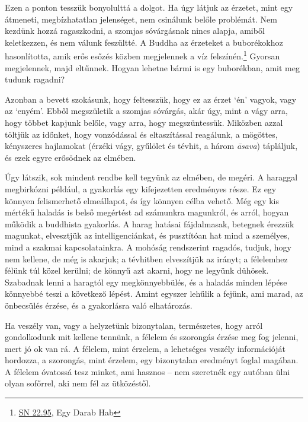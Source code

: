 
Ezen a ponton tesszük bonyolulttá a dolgot. Ha úgy látjuk az érzetet,
mint egy átmeneti, megbízhatatlan jelenséget, nem csinálunk belőle
problémát. Nem kezdünk hozzá ragaszkodni, a szomjas sóvárgásnak nincs
alapja, amiből keletkezzen, és nem válunk feszültté. A Buddha az
érzeteket a buborékokhoz hasonlította, amik erős esőzés közben
megjelennek a víz felszínén.\footnote{\href{https://suttacentral.net/sn22.95}{SN
  22.95}, Egy Darab Hab} Gyorsan megjelennek, majd eltűnnek. Hogyan
lehetne bármi is egy buborékban, amit meg tudunk ragadni?

Azonban a bevett szokásunk, hogy feltesszük, hogy ez az érzet `én'
vagyok, vagy az `enyém'. Ebből megszületik a szomjas sóvárgás, akár úgy,
mint a vágy arra, hogy többet kapjunk belőle, vagy arra, hogy
megszüntessük. Miközben azzal töltjük az időnket, hogy vonzódással és
eltaszítással reagálunk, a mögöttes, kényszeres hajlamokat (érzéki vágy,
gyűlölet és tévhit, a három \emph{āsava}) tápláljuk, és ezek egyre
erősödnek az elmében.

Úgy látszik, sok mindent rendbe kell tegyünk az elmében, de megéri. A
haraggal megbirkózni például, a gyakorlás egy kifejezetten eredményes
része. Ez egy könnyen felismerhető elmeállapot, és így könnyen célba
vehető. Még egy kis mértékű haladás is belső megértést ad számunkra
magunkról, és arról, hogyan működik a buddhista gyakorlás. A harag
hatásai fájdalmasak, betegnek érezzük magunkat, elvesztjük az
intelligenciánkat, és pusztítóan hat mind a személyes, mind a szakmai
kapcsolatainkra. A mohóság rendszerint ragadós, tudjuk, hogy nem
kellene, de még is akarjuk; a tévhitben elveszítjük az irányt; a
félelemhez félünk túl közel kerülni; de könnyű azt akarni, hogy ne
legyünk dühösek. Szabadnak lenni a haragtól egy megkönnyebbülés, és a
haladás minden lépése könnyebbé teszi a következő lépést. Amint egyszer
lehűlik a fejünk, ami marad, az önbecsülés érzése, és a gyakorlásra való
elhatározás.

\clearpage


Ha veszély van, vagy a helyzetünk bizonytalan, természetes, hogy arról
gondolkodunk mit kellene tennünk, a félelem és szorongás érzése meg fog
jelenni, mert jó ok van rá. A félelem, mint érzelem, a lehetséges
veszély információját hordozza, a szorongás, mint érzelem, egy
bizonytalan eredményt foglal magában. A félelem óvatossá tesz minket,
ami hasznos -- nem szeretnék egy autóban ülni olyan sofőrrel, aki nem
fél az ütközéstől.

